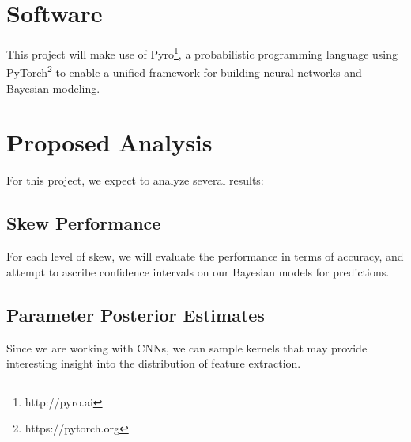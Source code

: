 \documentclass{article}
\begin{document}
\section{Software}
This project will make use of Pyro\footnote{http://pyro.ai}, a
probabilistic programming language using PyTorch\footnote{https://pytorch.org}
to enable a unified framework for building neural networks and Bayesian modeling.


\section{Proposed Analysis}
For this project, we expect to analyze several results:
\subsection{Skew Performance}
For each level of skew, we will evaluate the performance in terms of accuracy,
and attempt to ascribe confidence intervals on our Bayesian models for predictions.
\subsection{Parameter Posterior Estimates}
Since we are working with CNNs, we can sample kernels that may provide interesting
insight into the distribution of feature extraction.




\end{document}
